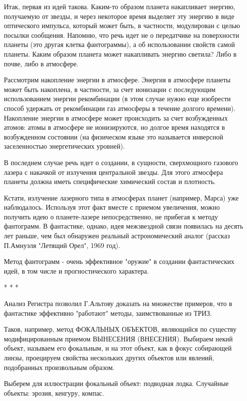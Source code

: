 \documentclass[11pt,a4paper]{article}
\begin{document}
Итак, первая из идей такова. Каким-то образом планета накапливает энергию, получаемую от звезды, и через некоторое время выделяет эту энергию в виде оптического импульса, который может быть, в частности, модулирован с целью посылки сообщения. Напомню, что речь идет не о передатчике на поверхности планеты (это другая клетка фантограммы), а об использовании свойств самой планеты. Каким образом планета может накапливать энергию светила? Либо в почве, либо в атмосфере.

Рассмотрим накопление энергии в атмосфере. Энергия в атмосфере планеты может быть накоплена, в частности, за счет ионизации с последующим использованием энергии рекомбинации (в этом случае нужно еще изобрести способ удержать от рекомбинации газ атмосферы в течение долгого времени). Накопление энергии в атмосфере может происходить за счет возбужденных атомов: атомы в атмосфере не ионизируются, но долгое время находятся в возбужденном состоянии (на физическом языке это называется инверсной заселенностью энергетических уровней).

В последнем случае речь идет о создании, в сущности, сверхмощного газового лазера с накачкой от излучения центральной звезды. Для этого атмосфера планеты должна иметь специфические химический состав и плотность.

Кстати, излучение лазерного типа в атмосферах планет (например, Марса) уже наблюдалось. Используя этот факт вместе с приемом увеличения, можно получить идею о планете-лазере непосредственно, не прибегая к методу фантограмм. В фантастике, однако, идея межзвездной связи появилась на десять лет раньше, чем был обнаружен реальный астрономический аналог (рассказ П.Амнуэля "Летящий Орел", 1969 год).

Метод фантограмм - очень эффективное "оружие" в создании фантастических идей, в том числе и прогностического характера.

* * *

Анализ Регистра позволил Г.Альтову доказать на множестве примеров, что в фантастике эффективно "работают" методы, заимствованные из ТРИЗ.

Таков, например, метод ФОКАЛЬНЫХ ОБЪЕКТОВ, являющийся по существу модифицированным приемом ВЫНЕСЕНИЯ (ВНЕСЕНИЯ). Выбираем некий объект, называем его фокальным, и на этот объект, как в фокус собирающей линзы, проецируем свойства нескольких других объектов или явлений, подобранных произвольным образом.

Выберем для иллюстрации фокальный объект: подводная лодка. Случайные объекты: эрозия, кенгуру, компас.
\end{document}
